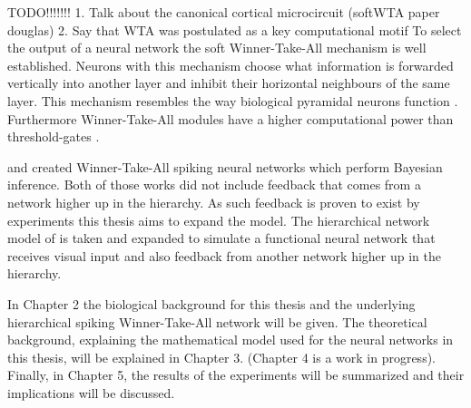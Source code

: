 TODO!!!!!!!
1. Talk about the canonical cortical microcircuit (softWTA paper douglas)
2. Say that WTA was postulated as a key computational motif
To select the output of a neural network the soft Winner-Take-All mechanism is well established. Neurons with this mechanism choose what information is forwarded vertically into another layer and inhibit their horizontal neighbours of the same layer.  This mechanism resembles the way biological pyramidal neurons function \citep{softWTA}. Furthermore Winner-Take-All modules have a higher computational power than threshold-gates \citep{WTAPower}.

\citet{nessler} and \citet{nesslerClone} created Winner-Take-All spiking neural networks which perform Bayesian inference. Both of those works did not include feedback that comes from a network higher up in the hierarchy. As such feedback is proven to exist by experiments this thesis aims to expand the model. The hierarchical network model of \citet{nessler} is taken and expanded to simulate a functional neural network that receives visual input and also feedback from another network higher up in the hierarchy.


In Chapter 2 the biological background for this thesis and the underlying hierarchical spiking Winner-Take-All network will be given. The theoretical background, explaining the mathematical model used for the neural networks in this thesis, will be explained in Chapter 3. (Chapter 4 is a work in progress). Finally, in Chapter 5, the results of the experiments will be summarized and their implications will be discussed.